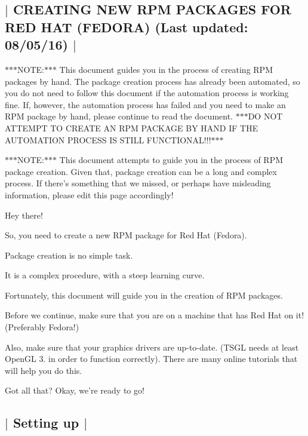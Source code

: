 

 \subsection*{$\vert$ C\-R\-E\-A\-T\-I\-N\-G N\-E\-W R\-P\-M P\-A\-C\-K\-A\-G\-E\-S F\-O\-R R\-E\-D H\-A\-T (F\-E\-D\-O\-R\-A) (Last updated\-: 08/05/16) $\vert$ }

$\ast$$\ast$$\ast$\-N\-O\-T\-E\-:$\ast$$\ast$$\ast$ This document guides you in the process of creating R\-P\-M packages by hand. The package creation process has already been automated, so you do not need to follow this document if the automation process is working fine. If, however, the automation process has failed and you need to make an R\-P\-M package by hand, please continue to read the document. $\ast$$\ast$$\ast$\-D\-O N\-O\-T A\-T\-T\-E\-M\-P\-T T\-O C\-R\-E\-A\-T\-E A\-N R\-P\-M P\-A\-C\-K\-A\-G\-E B\-Y H\-A\-N\-D I\-F T\-H\-E A\-U\-T\-O\-M\-A\-T\-I\-O\-N P\-R\-O\-C\-E\-S\-S I\-S S\-T\-I\-L\-L F\-U\-N\-C\-T\-I\-O\-N\-A\-L!!!$\ast$$\ast$$\ast$

$\ast$$\ast$$\ast$\-N\-O\-T\-E\-:$\ast$$\ast$$\ast$ This document attempts to guide you in the process of R\-P\-M package creation. Given that, package creation can be a long and complex process. If there's something that we missed, or perhaps have misleading information, please edit this page accordingly!

Hey there!

So, you need to create a new R\-P\-M package for Red Hat (Fedora).

Package creation is no simple task.

It is a complex procedure, with a steep learning curve.

Fortunately, this document will guide you in the creation of R\-P\-M packages.

Before we continue, make sure that you are on a machine that has Red Hat on it! (Preferably Fedora!)

Also, make sure that your graphics drivers are up-\/to-\/date. (T\-S\-G\-L needs at least Open\-G\-L 3. in order to function correctly). There are many online tutorials that will help you do this.

Got all that? Okay, we're ready to go! 

 \subsection*{$\vert$ Setting up $\vert$ }

